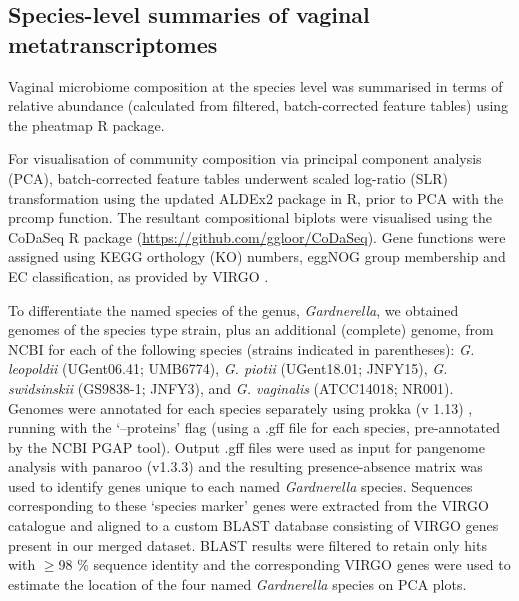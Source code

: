 \documentclass[sn-mathphys,Numbered]{sn-jnl}%
\begin{document}
\subsection{Species-level summaries of vaginal metatranscriptomes}
Vaginal microbiome composition at the species level was summarised in terms of relative abundance (calculated from filtered, batch-corrected feature tables) using the pheatmap R package. 

For visualisation of community composition via principal component analysis (PCA), batch-corrected feature tables underwent scaled log-ratio (SLR) transformation using the updated ALDEx2 package in R, prior to PCA with the prcomp function. The resultant compositional biplots were visualised using the CoDaSeq R package (\url{https://github.com/ggloor/CoDaSeq}). Gene functions were assigned using KEGG orthology (KO) numbers, eggNOG group membership and EC classification, as provided by VIRGO \citep{Ma:2020aa}.

To differentiate the named species of the genus, \textit{Gardnerella}, we obtained genomes of the species type strain, plus an additional (complete) genome, from NCBI for each of the following species (strains indicated in parentheses): \textit{G. leopoldii} (UGent06.41; UMB6774), \textit{G. piotii} (UGent18.01; JNFY15), \textit{G. swidsinskii} (GS9838-1; JNFY3), and \textit{G. vaginalis} (ATCC14018; NR001). Genomes were annotated for each species separately using prokka (v 1.13) \cite{Seemann:2014aa}, running with the `--proteins' flag (using a .gff file for each species, pre-annotated by the NCBI PGAP tool). Output .gff files were used as input for pangenome analysis with panaroo (v1.3.3) \cite{Tonkin-Hill:2020aa} and the resulting presence-absence matrix was used to identify genes unique to each named \textit{Gardnerella} species. Sequences corresponding to these `species marker' genes were extracted from the VIRGO catalogue and aligned to a custom BLAST database consisting of VIRGO genes present in our merged dataset. BLAST results were filtered to retain only hits with $\geq$98 \% sequence identity and the corresponding VIRGO genes were used to estimate the location of the four named \textit{Gardnerella} species on PCA plots.
\end{document}
